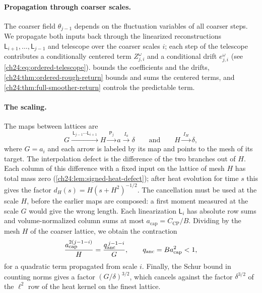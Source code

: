\paragraph{Propagation through coarser scales.}
The coarser field $\theta_{j-1}$ depends on the fluctuation variables of all coarser steps. We propagate both inputs back through the linearized reconstructions $\mathsf L_{i+1},\dots,\mathsf L_{j-1}$ and telescope over the coarser scales $i$; each step of the telescope contributes a conditionally centered term $Z^\omega_{j,i}$ and a conditional drift $e^\omega_{j,i}$ (see \eqref{ch24:eq:ordered-telescope}).  bounds the coefficients and the drifts, \cref{ch24:thm:ordered-rough-return} bounds and sums the centered terms, and \cref{ch24:thm:full-smoother-return} controls the predictable term.

\paragraph{The scaling.}
The maps between lattices are
\[
 G\xrightarrow{\ \mathsf L_{j-1}\cdots\mathsf L_{i+1}\ }H\xrightarrow{\ \mathsf P_j\ }a\xrightarrow{\ I_a\ }\delta
 \qquad\text{and}\qquad
 H\xrightarrow{\ I_H\ }\delta,
\]
where $G=a_i$ and each arrow is labeled by its map and points to the mesh of its target. The interpolation defect is the difference of the two branches out of $H$. Each column of this difference with a fixed input on the lattice of mesh $H$ has total mass zero (\cref{ch24:lem:signed-heat-defect}); after heat evolution for time $s$ this gives the factor $d_H(s)=H(s+H^2)^{-1/2}$. The cancellation must be used at the scale $H$, before the earlier maps are composed: a first moment measured at the scale $G$ would give the wrong length. Each linearization $\mathsf L_i$ has absolute row sums and volume-normalized column sums at most $a_{\mathrm{cap}}=C_{\mathrm{CP}}/B$. Dividing by the mesh $H$ of the coarser lattice, we obtain the contraction
\[
 \frac{a_{\mathrm{cap}}^{2(j-1-i)}}{H}=\frac{q_{\mathrm{anc}}^{\,j-1-i}}{G},\qquad q_{\mathrm{anc}}=Ba_{\mathrm{cap}}^2<1,
\]
for a quadratic term propagated from scale $i$. Finally, the Schur bound in counting norms gives a factor $(G/\delta)^{3/2}$, which cancels against the factor $\delta^{3/2}$ of the $\ell^2$ row of the heat kernel on the finest lattice.

